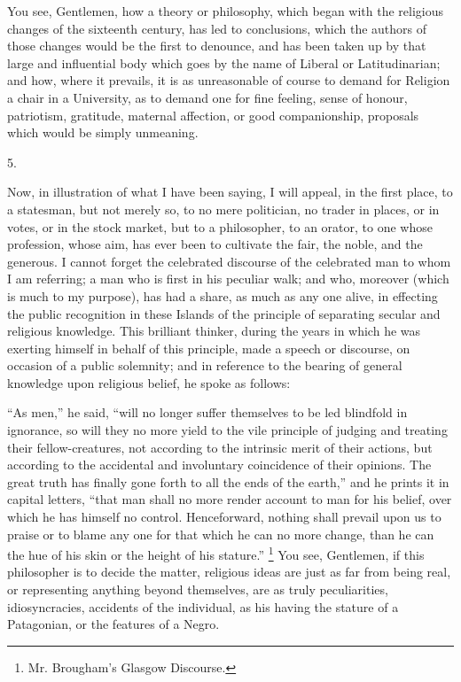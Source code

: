 You see, Gentlemen, how a theory or philosophy, which began with
the religious changes of the sixteenth century, has led to
conclusions, which the authors of those changes would be the first to
denounce, and has been taken up by that large and influential body
which goes by the name of Liberal or Latitudinarian; and how, where it
prevails, it is as unreasonable of course to demand for Religion a
chair in a University, as to demand one for fine feeling, sense of
honour, patriotism, gratitude, maternal affection, or good
companionship, proposals which would be simply unmeaning.

5.

Now, in illustration of what I have been saying, I will appeal, in
the first place, to a statesman, but not merely so, to no mere
politician, no trader in places, or in votes, or in the stock market,
but to a philosopher, to an orator, to one whose profession, whose
aim, has ever been to cultivate the fair, the noble, and the generous.
I cannot forget the celebrated discourse of the celebrated man to
whom I am referring; a man who is first in his peculiar walk; and who,
moreover (which is much to my purpose), has had a share, as much as
any one alive, in effecting the public recognition in these Islands of
the principle of separating secular and religious knowledge. This
brilliant thinker, during the years in which he was exerting himself
in behalf of this principle, made a speech or discourse, on occasion
of a public solemnity; and in reference to the bearing of general
knowledge upon religious belief, he spoke as follows:

``As men,'' he said, ``will no longer suffer themselves
to be led blindfold in ignorance, so will they no more yield to the
vile principle of judging and treating their fellow-creatures, not
according to the intrinsic merit of their actions, but according to
the accidental and involuntary coincidence of their opinions. The
great truth has finally gone forth to all the ends of the earth,''
and he prints it in capital letters, ``that man shall no more
render account to man for his belief, over which he has himself no
control. Henceforward, nothing shall prevail upon us to praise or to
blame any one for that which he can no more change, than he can the
hue of his skin or the height of his stature.'' \footnote{Mr. Brougham's Glasgow Discourse.} You see, Gentlemen, if this philosopher is to decide the
matter, religious ideas are just as far from being real, or
representing anything beyond themselves, are as truly peculiarities,
idiosyncracies, accidents of the individual, as his having the stature
of a Patagonian, or the features of a Negro.

